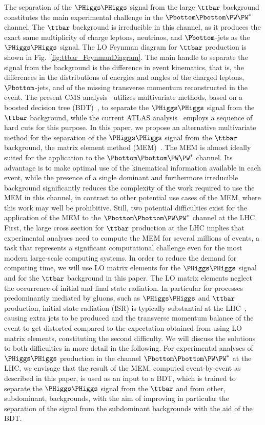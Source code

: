 The separation of the $\PHiggs\PHiggs$ signal from the large $\ttbar$ background constitutes the main experimental challenge in the $\Pbottom\Pbottom\PW\PW^{*}$ channel.
The $\ttbar$ background is irreducible in this channel, as it produces the exact same multiplicity of charge leptons, neutrinos, and $\Pbottom$-jets as the $\PHiggs\PHiggs$ signal.
The LO Feynman diagram for $\ttbar$ production is shown in Fig.~\ref{fig:ttbar_FeynmanDiagram}.
The main handle to separate the signal from the background is the difference in event kinematics,
that is, the differences in the distributions of energies and angles of the charged leptons, $\Pbottom$-jets, and of the missing transverse momentum reconstructed in the event.
The present CMS analysis~\cite{HIG-17-006} utilizes multivariate methods, based on a boosted decision tree (BDT)~\cite{TMVA},
to separate the $\PHiggs\PHiggs$ signal from the $\ttbar$ background, while the current ATLAS analysis~\cite{Aaboud:2018zhh} employs a sequence of hard cuts for this purpose.
In this paper, we propose an alternative multivariate method for the separation of the $\PHiggs\PHiggs$ signal from the $\ttbar$ background,
the matrix element method (MEM)~\cite{Kondo:1988yd,Kondo:1991dw}.
The MEM is almost ideally suited for the application to the $\Pbottom\Pbottom\PW\PW^{*}$ channel.
Its advantage is to make optimal use of the kinematical information available in each event,
while the presence of a single dominant and furthermore irreducible background significantly reduces the complexity of the work required to use the MEM in this channel,
in contrast to other potential use cases of the MEM, where this work may well be prohibitive.
Still, two potential difficulties exist for the application of the MEM to the $\Pbottom\Pbottom\PW\PW^{*}$ channel at the LHC.
First, the large cross section for $\ttbar$ production at the LHC implies that experimental analyses need to compute the MEM for several millions of events,
a task that represents a significant computational challenge even for the most modern large-scale computing systems.
In order to reduce the demand for computing time,
we will use LO matrix elements for the $\PHiggs\PHiggs$ signal and for the $\ttbar$ background in this paper.
The LO matrix elements neglect the occurrence of initial and final state radiation.
In particular for processes predominantly mediated by gluons, such as $\PHiggs\PHiggs$ and $\ttbar$ production,
initial state radiation (ISR) is typically substantial at the LHC~\cite{Alwall:2010cq},
causing extra jets to be produced and the transverse momentum balance of the event to get distorted compared to the expectation obtained from using LO matrix elements,
constituting the second difficulty.
We will discuss the solutions to both difficulties in more detail in the following.
For experimental analyses of $\PHiggs\PHiggs$ production in the channel $\Pbottom\Pbottom\PW\PW^{*}$ at the LHC,
we envisage that the result of the MEM, computed event-by-event as described in this paper, 
is used as an input to a BDT, which is trained to separate the $\PHiggs\PHiggs$ signal from the $\ttbar$ and from other, subdominant, backgrounds,
with the aim of improving in particular the separation of the signal from the subdominant backgrounds with the aid of the BDT.

